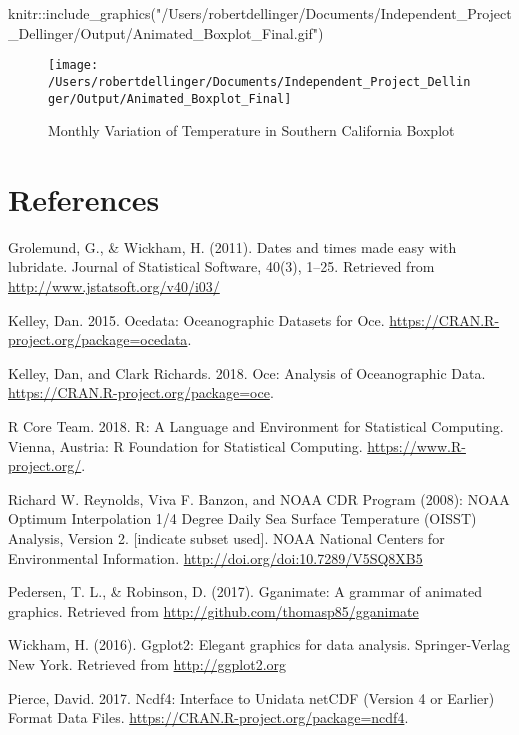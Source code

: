 \documentclass[]{tufte-handout}
\newenvironment{Shaded}{}{}
\newcommand{\FunctionTok}[1]{\textcolor[rgb]{0.02,0.16,0.49}{#1}}
\newcommand{\NormalTok}[1]{#1}
\newcommand{\SpecialCharTok}[1]{\textcolor[rgb]{0.25,0.44,0.63}{#1}}
\newcommand{\StringTok}[1]{\textcolor[rgb]{0.25,0.44,0.63}{#1}}
\begin{document}
\begin{Shaded}
\begin{Highlighting}[]
\NormalTok{knitr}\SpecialCharTok{::}\FunctionTok{include\_graphics}\NormalTok{(}\StringTok{"/Users/robertdellinger/Documents/Independent\_Project\_Dellinger/Output/Animated\_Boxplot\_Final.gif"}\NormalTok{)}
\end{Highlighting}
\end{Shaded}

\begin{figure}
\texttt{[image: /Users/robertdellinger/Documents/Independent\_Project\_Dellinger/Output/Animated\_Boxplot\_Final]} \caption[Monthly Variation of Temperature in Southern California Boxplot]{Monthly Variation of Temperature in Southern California Boxplot}\label{fig:unnamed-chunk-5}
\end{figure}

\hypertarget{references}{%
\section{References}\label{references}}

Grolemund, G., \& Wickham, H. (2011). Dates and times made easy with
lubridate. Journal of Statistical Software, 40(3), 1--25. Retrieved from
\url{http://www.jstatsoft.org/v40/i03/}

Kelley, Dan. 2015. Ocedata: Oceanographic Datasets for Oce.
\url{https://CRAN.R-project.org/package=ocedata}.

Kelley, Dan, and Clark Richards. 2018. Oce: Analysis of Oceanographic
Data. \url{https://CRAN.R-project.org/package=oce}.

R Core Team. 2018. R: A Language and Environment for Statistical
Computing. Vienna, Austria: R Foundation for Statistical Computing.
\url{https://www.R-project.org/}.

Richard W. Reynolds, Viva F. Banzon, and NOAA CDR Program (2008): NOAA
Optimum Interpolation 1/4 Degree Daily Sea Surface Temperature (OISST)
Analysis, Version 2. {[}indicate subset used{]}. NOAA National Centers
for Environmental Information. \url{http://doi.org/doi:10.7289/V5SQ8XB5}

Pedersen, T. L., \& Robinson, D. (2017). Gganimate: A grammar of
animated graphics. Retrieved from
\url{http://github.com/thomasp85/gganimate}

Wickham, H. (2016). Ggplot2: Elegant graphics for data analysis.
Springer-Verlag New York. Retrieved from \url{http://ggplot2.org}

Pierce, David. 2017. Ncdf4: Interface to Unidata netCDF (Version 4 or
Earlier) Format Data Files.
\url{https://CRAN.R-project.org/package=ncdf4}.
\end{document}
